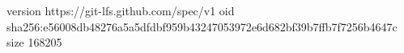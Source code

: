 version https://git-lfs.github.com/spec/v1
oid sha256:e56008db48276a5a5dfdbf959b43247053972e6d682bf39b7ffb7f7256b4647c
size 168205
